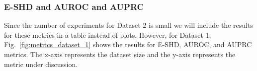 \documentclass{lxaiproposal}
\begin{document}

    \subsubsection{E-SHD and AUROC and AUPRC}

    Since the number of experiments for Dataset 2 is small we will include the results for these metrics in a
    table instead of plots. However, for Dataset 1, Fig.~\ref{fig:metrics_dataset_1} shows the results for E-SHD, AUROC,
    and AUPRC metrics. The x-axis represents the dataset size and the y-axis represents the metric under discussion.
\end{document}
